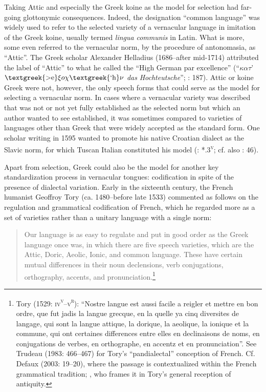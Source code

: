 \documentclass[output=paper]{langsci/langscibook}
\begin{document}
Taking Attic and especially the Greek koine as the model for selection had far-going glottonymic consequences. Indeed, the designation “common language” was widely used to refer to the selected variety of a vernacular language in imitation of the Greek koine, usually termed \textit{lingua} \textit{communis} in Latin. What is more, some even referred to the vernacular norm, by the procedure of antonomasia, as “Attic”. The Greek scholar Alexander Helladius (1686–after mid-1714) attributed the label of “Attic” to what he called the “High German par excellence” (“$\kappa \alpha \tau $’ $\text{\textgreek{>e}}\xi o\chi \text{\textgreek{`h}}\nu $ \textit{das} \textit{Hochteutsche}”; \citealt{Helladius1714}: 187). Attic or koine Greek were not, however, the only speech forms that could serve as the model for selecting a vernacular norm. In cases where a vernacular variety was described that was not or not yet fully established as the selected norm but which an author wanted to see established, it was sometimes compared to varieties of languages other than Greek that were widely accepted as the standard form. One scholar writing in 1595 wanted to promote his native Croatian dialect as the Slavic norm, for which Tuscan Italian constituted his model (\citealt{Veranzio1595}: *.3\textsc{\textsuperscript{v}}; cf. also \citealt{Schoppe1636}: 46).

Apart from selection, Greek could also be the model for another key standardization process in vernacular tongues: codification in spite of the presence of dialectal variation. Early in the sixteenth century, the French humanist Geoffroy Tory (ca. 1480–before late 1533) commented as follows on the regulation and grammatical codification of French, which he regarded more as a set of varieties rather than a unitary language with a single norm:

\begin{quote}
Our language is as easy to regulate and put in good order as the Greek language once was, in which there are five speech varieties, which are the Attic, Doric, Aeolic, Ionic, and common language. These have certain mutual differences in their noun declensions, verb conjugations, orthography, accents, and pronunciation.\footnote{Tory (1529: \textsc{iv}\textsc{\textsuperscript{v}}\textsc{–v}\textsc{\textsuperscript{r}}): “Nostre langue est aussi facile a reigler et mettre en bon ordre, que fut jadis la langue grecque, en la quelle ya cinq diversites de langage, qui sont la langue attique, la dorique, la aeolique, la ionique et la commune, qui ont certaines differences entre elles en declinaisons de noms, en conjugations de verbes, en orthographe, en accentz et en pronunciation”. See Trudeau (1983: 466–467) for Tory’s “pandialectal” conception of French. Cf. Defaux (2003: 19–20), where the passage is contextualized within the French grammatical tradition; \citet[23]{Cordier2006}, who frames it in Tory’s general reception of antiquity.}
\end{quote}
\end{document}
